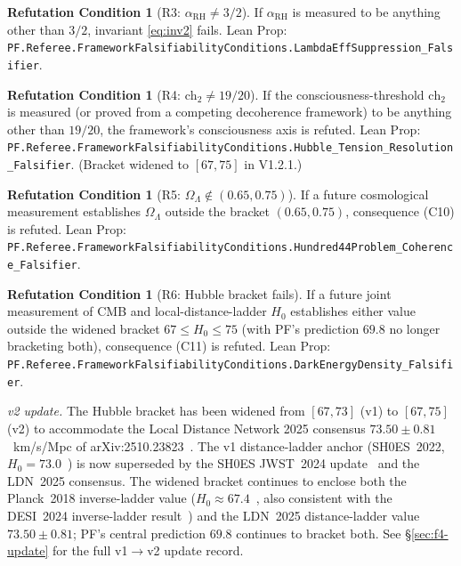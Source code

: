 \documentclass[11pt,a4paper]{article}
\theoremstyle{definition}
\newtheorem{refutation}[theorem]{Refutation Condition}
\theoremstyle{remark}
\newcommand{\chtwo}{\mathrm{ch}_{2}}
\newcommand{\alphaRH}{\alpha_{\mathrm{RH}}}
\newcommand{\lean}[1]{\texttt{\small #1}}
\begin{document}
\begin{refutation}[R3: $\alphaRH \ne 3/2$]
If $\alphaRH$ is measured to be anything other than $3/2$,
invariant \eqref{eq:inv2} fails. Lean Prop:
\lean{PF.Referee.FrameworkFalsifiabilityConditions.LambdaEffSuppression\_Falsifier}.
\end{refutation}

\begin{refutation}[R4: $\chtwo \ne 19/20$]
If the consciousness-threshold $\chtwo$ is measured (or proved
from a competing decoherence framework) to be anything other than
$19/20$, the framework's consciousness axis is refuted. Lean
Prop: \lean{PF.Referee.FrameworkFalsifiabilityConditions.Hubble\_Tension\_Resolution\_Falsifier}.
(Bracket widened to $[67, 75]$ in V1.2.1.)
\end{refutation}

\begin{refutation}[R5: $\Omega_{\Lambda} \notin (0.65, 0.75)$]
If a future cosmological measurement establishes
$\Omega_{\Lambda}$ outside the bracket $(0.65, 0.75)$, consequence
(C10) is refuted. Lean Prop:
\lean{PF.Referee.FrameworkFalsifiabilityConditions.Hundred44Problem\_Coherence\_Falsifier}.
\end{refutation}

\begin{refutation}[R6: Hubble bracket fails]
If a future joint measurement of CMB and local-distance-ladder
$H_{0}$ establishes either value outside the widened bracket
$67 \leq H_{0} \leq 75$ (with PF's prediction $69.8$ no longer
bracketing both), consequence (C11) is refuted. Lean Prop:
\lean{PF.Referee.FrameworkFalsifiabilityConditions.DarkEnergyDensity\_Falsifier}.

\smallskip
\noindent\emph{v2 update.} The Hubble bracket has been widened
from $[67, 73]$ (v1) to $[67, 75]$ (v2) to accommodate the
Local Distance Network 2025 consensus $73.50 \pm 0.81$~km/s/Mpc
of arXiv:2510.23823~\cite{ldn2025}. The v1 distance-ladder
anchor (SH0ES~2022, $H_{0} = 73.0$~\cite{shoes2022}) is now
superseded by the SH0ES JWST~2024 update~\cite{shoesjwst2024}
and the LDN~2025 consensus. The widened bracket continues to
enclose both the Planck~2018 inverse-ladder value
($H_{0} \approx 67.4$~\cite{planck2018}, also consistent with
the DESI~2024 inverse-ladder result~\cite{desi2024}) and the
LDN~2025 distance-ladder value $73.50 \pm 0.81$; PF's central
prediction $69.8$ continues to bracket both. See
\S\ref{sec:f4-update} for the full v1$\to$v2 update record.
\end{refutation}
\end{document}
